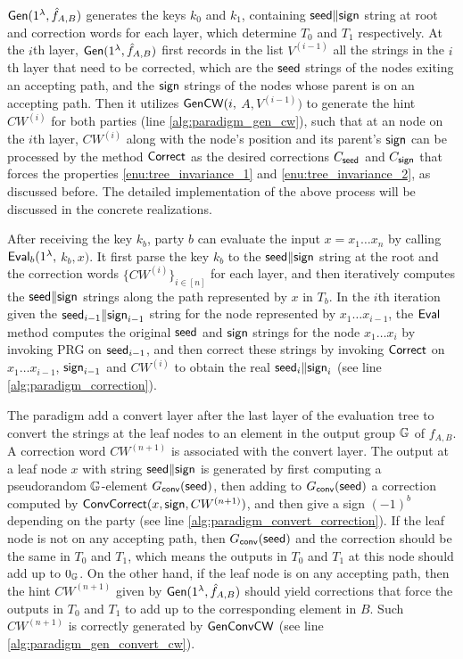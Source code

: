 ${\sf Gen}(1^\lambda, \hat{f}_{A,B})$ generates the keys $k_0$ and $k_1$, containing ${\sf seed}\|{\sf sign}$ string at root and correction words for each layer, which determine $T_0$ and $T_1$ respectively. 
At the $i$th layer, ${\sf Gen}(1^\lambda, \hat{f}_{A,B})$ first records in the list $V^{(i-1)}$ all the strings in the $i$th layer that need to be corrected, which are the ${\sf seed}$ strings of the nodes exiting an accepting path, and the ${\sf sign}$ strings of the nodes whose parent is on an accepting path. Then it utilizes ${\sf GenCW}(i,$ $A, V^{(i-1)})$ to generate the hint $CW^{(i)}$ for both parties (line \ref{alg:paradigm_gen_cw}), such that at an node on the $i$th layer, $CW^{(i)}$ along with the node's position and its parent's ${\sf sign}$ can be processed by the method ${\sf Correct}$ as the desired corrections $C_{\sf seed}$ and $C_{\sf sign}$ that forces the properties \ref{enu:tree_invariance_1} and \ref{enu:tree_invariance_2}, as discussed before. 
The detailed implementation of the above process will be discussed in the concrete realizations.


After receiving the key $k_b$, party $b$ can evaluate the input $x=x_1\dots x_n$ by calling ${\sf Eval}_b(1^\lambda,$ $k_b,x)$. It first parse the key $k_b$ to the ${\sf seed}\|{\sf sign}$ string at the root and the correction words $\{CW^{(i)}\}_{i\in[n]}$ for each layer, and then iteratively computes the ${\sf seed}\|{\sf sign}$ strings along the path represented by $x$ in $T_b$. In the $i$th iteration given the ${\sf seed}_{i-1}\|{\sf sign}_{i-1}$ string for the node represented by $x_1\dots x_{i-1}$, the ${\sf Eval}$ method computes the original ${\sf seed}$ and ${\sf sign}$ strings for the node $x_1\dots x_{i}$ by invoking PRG on ${\sf seed}_{i-1}$, and then correct these strings by invoking ${\sf Correct}$ on $x_1\dots x_{i-1}$, ${\sf sign}_{i-1}$ and $CW^{(i)}$ to obtain the real ${\sf seed}_i\|{\sf sign}_i$ (see line \ref{alg:paradigm_correction}).  

The paradigm add a convert layer after the last layer of the evaluation tree to convert the strings at the leaf nodes to an element in the output group $\mathbb{G}$ of $f_{A,B}$. A correction word $CW^{(n+1)}$ is associated with the convert layer. The output at a leaf node $x$ with string ${\sf seed}\|{\sf sign}$ is generated by first computing a pseudorandom $\mathbb{G}$-element $G_{\sf conv}({\sf seed})$, then adding to $G_{\sf conv}({\sf seed})$ a correction computed by ${\sf ConvCorrect}(x, {\sf sign}, CW^{(n+1)})$, and then give a sign $(-1)^b$ depending on the party (see line \ref{alg:paradigm_convert_correction}). If the leaf node is not on any accepting path, then $G_{\sf conv}({\sf seed})$ and the correction should be the same in $T_0$ and $T_1$, which means the outputs in $T_0$ and $T_1$ at this node should add up to $0_{\mathbb{G}}$. On the other hand, if the leaf node is on any accepting path, then the hint $CW^{(n+1)}$ given by ${\sf Gen}(1^\lambda, \hat{f}_{A,B})$ should yield corrections that force the outputs in $T_0$ and $T_1$ to add up to the corresponding element in $B$. Such $CW^{(n+1)}$ is correctly generated by $\sf GenConvCW$ (see line \ref{alg:paradigm_gen_convert_cw}). 

